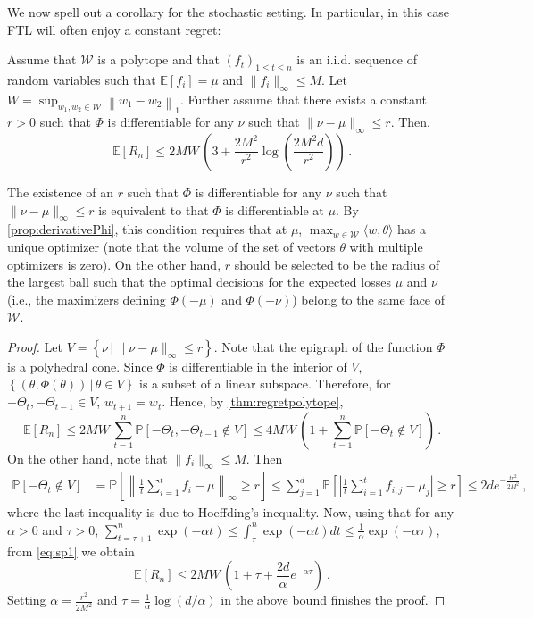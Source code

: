 \documentclass[english]{article}
\newcommand{\cW}{\mathcal{W}}
\newcommand{\Exp}[1]{\mathbb{E}\left[ #1 \right]}
\newcommand{\ip}[1]{\langle#1\rangle}
\newcommand{\set}[2]{\left\{#1 \,\vert\, #2 \right\}}
\newcommand{\norm}[1]{\left\| #1 \right\|}
\newcommand{\Prob}[1]{\mathbb{P}\left[#1\right]}
\begin{document}
We now spell out a corollary for the stochastic setting. In particular, in this case FTL will often enjoy a constant regret:
\begin{corollary}
	\label{cor:stocpolytope} Assume that $\cW$ is a polytope and 
	that $(f_t)_{1\le t \le n}$ is an i.i.d. sequence of random variables 
	such that $\Exp{f_i} = \mu$ and $\|f_i\|_\infty \le M$. Let  $W = \sup_{w_1,w_2\in \cW} \norm{w_1-w_2}_1$.
	Further assume that there exists a constant $r > 0$ 
	such that $\Phi$ is differentiable for any $\nu$ such that $\|\nu-\mu\|_\infty \le r$. 
	Then, 
	\[
		\Exp{R_n} \le 2MW \, \left( 3 + \frac{2M^2}{r^2}\log\left(\frac{2M^2d}{r^2}\right)\right)\,.
	\]
\end{corollary}
 	The existence of an $r$ such that $\Phi$ is differentiable for any $\nu$ such that $\|\nu-\mu\|_\infty \le r$ is equivalent to that $\Phi$ is differentiable at $\mu$. 
	By \cref{prop:derivativePhi}, this condition requires that at $\mu$, $\max_{w\in\cW} \ip{w,\theta}$ has a unique optimizer (note that the volume of the set of vectors $\theta$ with multiple optimizers is zero). 
	On the other hand,  $r$ should be selected to be the radius of the largest ball such that the optimal decisions for the expected losses $\mu$ and $\nu$ (i.e., the maximizers defining $\Phi(-\mu)$ and $\Phi(-\nu)$) belong to the same face of $\cW$.
\begin{proof}
	Let $V = \set{\nu}{\|\nu - \mu\|_\infty\le r}$. 
	Note that the epigraph of the function $\Phi$ is a polyhedral cone.
	Since $\Phi$ is differentiable in the interior of $V$, $\set{(\theta, \Phi(\theta))}{\theta\in V}$ is a subset of a linear subspace.
	Therefore, for $-\Theta_t, -\Theta_{t-1} \in V$, $w_{t+1}=w_t$.
	Hence, by \cref{thm:regretpolytope},
	\begin{equation}
	\label{eq:sp1}
	\Exp{R_n} \le 2MW\,\sum_{t=1}^{n} \Prob{-\Theta_t,-\Theta_{t-1} \notin V}
	 \le 4MW\,\left(1+\sum_{t=1}^{n} \Prob{-\Theta_t \notin V}\right)\,.
	\end{equation}
	On the other hand, note that $\|f_i\|_\infty\le M$.
	Then 
	\begin{align*}
	\Prob{-\Theta_t \notin V}
	    & = \Prob{ \norm{\frac{1}{t} \sum_{i=1}^{t} f_i - \mu}_\infty \ge r}
		 \le \sum_{j=1}^{d} \Prob{ \left|\frac{1}{t} \sum_{i=1}^{t} f_{i,j} - \mu_j\right| \ge r }
		 \le 2d e^{-\frac{tr^2}{2M^2}}\,,
	\end{align*}
	where the last inequality
	is due to Hoeffding's inequality.
	Now, using that for any $\alpha>0$ and  $\tau > 0$, $\sum_{t=\tau+1}^n \exp(-\alpha t ) \le \int_\tau^n \exp(-\alpha t ) dt 
	\le \frac{1}{\alpha}\exp(-\alpha\tau)$, from \eqref{eq:sp1} we obtain
\[
	\Exp{R_n} \le 2MW \, \left(1+\tau + \frac{2d}{\alpha}e^{-\alpha\tau} \right)~.
\]
Setting $\alpha = \frac{r^2}{2M^2}$ and $\tau = \frac{1}{\alpha}\log(d/\alpha)$ in the above bound finishes the proof.
\end{proof}
\end{document}

